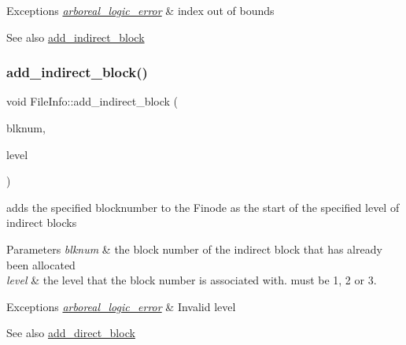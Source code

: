 \begin{DoxyExceptions}{Exceptions}
{\em \mbox{\hyperlink{classarboreal__logic__error}{arboreal\+\_\+logic\+\_\+error}}} & index out of bounds \\
\hline
\end{DoxyExceptions}
\begin{DoxySeeAlso}{See also}
\mbox{\hyperlink{classFileInfo_a074956f43b5a6900205a541dbeaeb8c5}{add\+\_\+indirect\+\_\+block}} 
\end{DoxySeeAlso}
\mbox{\label{classFileInfo_a074956f43b5a6900205a541dbeaeb8c5}} 
\subsubsection{\texorpdfstring{add\+\_\+indirect\+\_\+block()}{add\_indirect\_block()}}
{\footnotesize\ttfamily void File\+Info\+::add\+\_\+indirect\+\_\+block (\begin{DoxyParamCaption}\item[{Blk\+Num\+Type}]{blknum,  }\item[{short}]{level }\end{DoxyParamCaption})}

adds the specified blocknumber to the Finode as the start of the specified level of indirect blocks 
\begin{DoxyParams}{Parameters}
{\em blknum} & the block number of the indirect block that has already been allocated \\
\hline
{\em level} & the level that the block number is associated with. must be 1, 2 or 3. \\
\hline
\end{DoxyParams}

\begin{DoxyExceptions}{Exceptions}
{\em \mbox{\hyperlink{classarboreal__logic__error}{arboreal\+\_\+logic\+\_\+error}}} & Invalid level \\
\hline
\end{DoxyExceptions}
\begin{DoxySeeAlso}{See also}
\mbox{\hyperlink{classFileInfo_a1537d2ac2b5c170d144911c8337c81bc}{add\+\_\+direct\+\_\+block}} 
\end{DoxySeeAlso}
\mbox{\label{classFileInfo_a2ca34d945ed1208f227a249ba72ee427}} 
